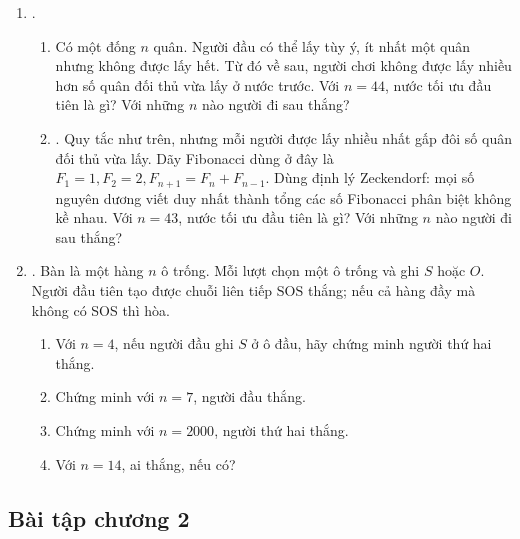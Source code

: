 \documentclass[11pt]{article}
\begin{document}
\begin{enumerate}
  \item {}.
  \begin{enumerate}
    \item Có một đống \(n\) quân. Người đầu có thể lấy tùy ý, ít nhất một quân
    nhưng không được lấy hết. Từ đó về sau, người chơi không được lấy nhiều
    hơn số quân đối thủ vừa lấy ở nước trước. Với \(n=44\), nước tối ưu đầu
    tiên là gì? Với những \(n\) nào người đi sau thắng?
    \item {}. Quy tắc như trên, nhưng mỗi người được lấy
    nhiều nhất gấp đôi số quân đối thủ vừa lấy. Dãy Fibonacci dùng ở đây là
    \(F_1=1,F_2=2,F_{n+1}=F_n+F_{n-1}\). Dùng định lý Zeckendorf: mọi số nguyên
    dương viết duy nhất thành tổng các số Fibonacci phân biệt không kề nhau.
    Với \(n=43\), nước tối ưu đầu tiên là gì? Với những \(n\) nào người đi sau
    thắng?
  \end{enumerate}

  \item {}. Bàn là một hàng \(n\) ô trống. Mỗi lượt chọn một ô
  trống và ghi \(S\) hoặc \(O\). Người đầu tiên tạo được chuỗi liên tiếp
  \(\text{SOS}\) thắng; nếu cả hàng đầy mà không có SOS thì hòa.
  \begin{enumerate}
    \item Với \(n=4\), nếu người đầu ghi \(S\) ở ô đầu, hãy chứng minh người
    thứ hai thắng.
    \item Chứng minh với \(n=7\), người đầu thắng.
    \item Chứng minh với \(n=2000\), người thứ hai thắng.
    \item Với \(n=14\), ai thắng, nếu có?
  \end{enumerate}
\end{enumerate}

\subsection{Bài tập chương 2}
\end{document}
